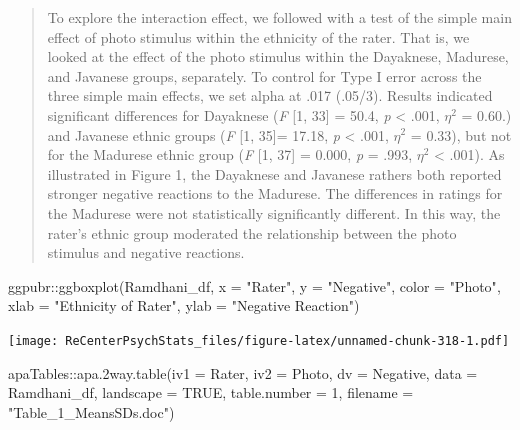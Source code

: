 \documentclass[
  11pt,
]{book}
\newenvironment{Shaded}{\begin{snugshade}}{\end{snugshade}}
\newcommand{\AttributeTok}[1]{\textcolor[rgb]{0.77,0.63,0.00}{#1}}
\newcommand{\ConstantTok}[1]{\textcolor[rgb]{0.00,0.00,0.00}{#1}}
\newcommand{\DecValTok}[1]{\textcolor[rgb]{0.00,0.00,0.81}{#1}}
\newcommand{\FunctionTok}[1]{\textcolor[rgb]{0.00,0.00,0.00}{#1}}
\newcommand{\NormalTok}[1]{#1}
\newcommand{\SpecialCharTok}[1]{\textcolor[rgb]{0.00,0.00,0.00}{#1}}
\newcommand{\StringTok}[1]{\textcolor[rgb]{0.31,0.60,0.02}{#1}}
\begin{document}
\begin{quote}
To explore the interaction effect, we followed with a test of the simple main effect of photo stimulus within the ethnicity of the rater. That is, we looked at the effect of the photo stimulus within the Dayaknese, Madurese, and Javanese groups, separately. To control for Type I error across the three simple main effects, we set alpha at .017 (.05/3). Results indicated significant differences for Dayaknese (\emph{F} {[}1, 33{]} = 50.4, \emph{p} \textless{} .001, \(\eta ^{2}\) = 0.60.) and Javanese ethnic groups (\emph{F} {[}1, 35{]}= 17.18, \emph{p} \textless{} .001, \(\eta ^{2}\) = 0.33), but not for the Madurese ethnic group (\emph{F} {[}1, 37{]} = 0.000, \emph{p} = .993, \(\eta ^{2}\) \textless{} .001). As illustrated in Figure 1, the Dayaknese and Javanese rathers both reported stronger negative reactions to the Madurese. The differences in ratings for the Madurese were not statistically significantly different. In this way, the rater's ethnic group moderated the relationship between the photo stimulus and negative reactions.
\end{quote}

\begin{Shaded}
\begin{Highlighting}[]
\NormalTok{ggpubr}\SpecialCharTok{::}\FunctionTok{ggboxplot}\NormalTok{(Ramdhani\_df, }\AttributeTok{x =} \StringTok{"Rater"}\NormalTok{, }\AttributeTok{y =} \StringTok{"Negative"}\NormalTok{, }\AttributeTok{color =} \StringTok{"Photo"}\NormalTok{,}
    \AttributeTok{xlab =} \StringTok{"Ethnicity of Rater"}\NormalTok{, }\AttributeTok{ylab =} \StringTok{"Negative Reaction"}\NormalTok{)}
\end{Highlighting}
\end{Shaded}

\texttt{[image: ReCenterPsychStats\_files/figure-latex/unnamed-chunk-318-1.pdf]}

\begin{Shaded}
\begin{Highlighting}[]
\NormalTok{apaTables}\SpecialCharTok{::}\FunctionTok{apa.2way.table}\NormalTok{(}\AttributeTok{iv1 =}\NormalTok{ Rater, }\AttributeTok{iv2 =}\NormalTok{ Photo, }\AttributeTok{dv =}\NormalTok{ Negative, }\AttributeTok{data =}\NormalTok{ Ramdhani\_df,}
    \AttributeTok{landscape =} \ConstantTok{TRUE}\NormalTok{, }\AttributeTok{table.number =} \DecValTok{1}\NormalTok{, }\AttributeTok{filename =} \StringTok{"Table\_1\_MeansSDs.doc"}\NormalTok{)}
\end{Highlighting}
\end{Shaded}
\end{document}
